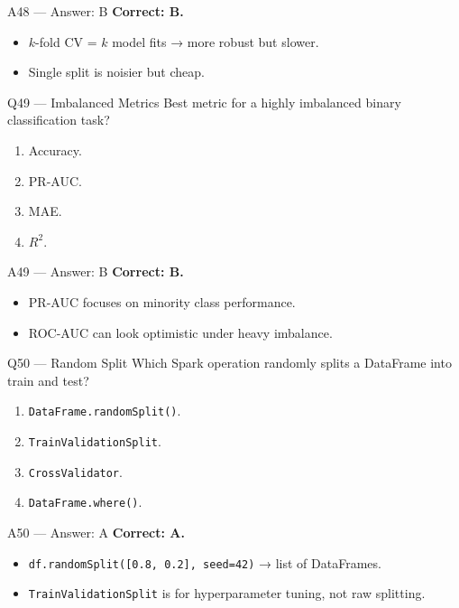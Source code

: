 \documentclass[aspectratio=169,10pt]{beamer}
\begin{document}
	\begin{frame}{A48 — Answer: B}
		\textbf{Correct: B.}
		\begin{itemize}
			\item $k$-fold CV = $k$ model fits → more robust but slower.
			\item Single split is noisier but cheap.
		\end{itemize}
	\end{frame}
	
	\begin{frame}{Q49 — Imbalanced Metrics}
		Best metric for a highly imbalanced binary classification task?
		\begin{enumerate}[label=\Alph*.]
			\item Accuracy.
			\item PR-AUC.
			\item MAE.
			\item $R^2$.
		\end{enumerate}
	\end{frame}
	
	\begin{frame}{A49 — Answer: B}
		\textbf{Correct: B.}
		\begin{itemize}
			\item PR-AUC focuses on minority class performance.
			\item ROC-AUC can look optimistic under heavy imbalance.
		\end{itemize}
	\end{frame}
	
	\begin{frame}{Q50 — Random Split}
		Which Spark operation randomly splits a DataFrame into train and test?
		\begin{enumerate}[label=\Alph*.]
			\item \texttt{DataFrame.randomSplit()}.
			\item \texttt{TrainValidationSplit}.
			\item \texttt{CrossValidator}.
			\item \texttt{DataFrame.where()}.
		\end{enumerate}
	\end{frame}
	
	\begin{frame}{A50 — Answer: A}
		\textbf{Correct: A.}
		\begin{itemize}
			\item \texttt{df.randomSplit([0.8, 0.2], seed=42)} → list of DataFrames.
			\item \texttt{TrainValidationSplit} is for hyperparameter tuning, not raw splitting.
		\end{itemize}
	\end{frame}
	
\end{document}

